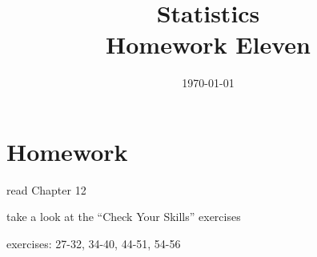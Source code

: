 \documentclass[letterpaper, landscape]{exam}
\title{Statistics \\ Homework Eleven}
\date{\today}
\author{}
\begin{document}
  \maketitle

  \section{Homework}
  \ifprintanswers
  \else
    \begin{itemize*}
      \item read Chapter 12 
      \item take a look at the ``Check Your Skills'' exercises
      \item exercises: 27-32, 34-40, 44-51, 54-56
    \end{itemize*}
  \fi

  \ifprintanswers
\end{document}
